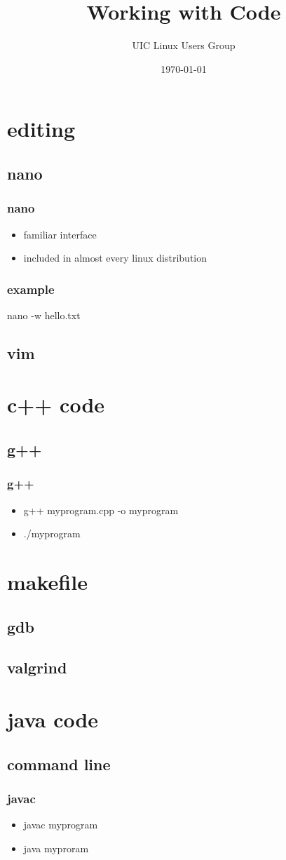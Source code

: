 \documentclass[hyperref={pdfpagelabels=false}]{beamer}
\title{Working with Code}
\author{UIC Linux Users Group}
\date{\today}
\begin{document}
\frame{\titlepage}
\section[outline]{}
\frame{\tableofcontents}
\section{editing}
\subsection{nano}
\frame
{
    \frametitle{nano}
    \begin{itemize}
    \item{familiar interface}
    \item{included in almost every linux distribution}
    \end{itemize}
}
\frame
{
    \frametitle{example}
    nano -w hello.txt
}
\subsection{vim}
\section{c++ code}
\subsection{g++}
\frame
{
    \frametitle{g++}
    \begin{itemize}
    \item{g++ myprogram.cpp -o myprogram}
    \item{./myprogram}
    \end{itemize}
}
\section{makefile}
\subsection{gdb}
\subsection{valgrind}
\section{java code}
\subsection{command line}
\frame
{
    \frametitle{javac}
    \begin{itemize}
    \item{javac myprogram}
    \item{java myproram}
    \end{itemize}
}
\end{document}
